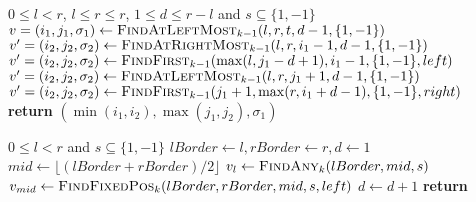 \begin{appendix}
    \begin{algorithm}[h!]
        \caption{$(l,r,d,t,s)$}\label{alg:falm_k}
        \begin{algorithmic}
            \Require $0 \leq l < r$, $l \leq r \leq r$, $1\leq d \leq r-l$ and $s \subseteq \{1,-1\}$
            \State $v = (i_1,j_1,\sigma_1) \gets \textsc{FindAtLeftMost$_{k-1}$}(l,r,t,d-1,\{1,-1\})$
             {
                \State $v' = (i_2,j_2,\sigma_2) \gets \textsc{FindAtRightMost$_{k-1}$}(l,r,i_1-1,d-1,\{1,-1\})$
                \State $v' = (i_2,j_2,\sigma_2) \gets \textsc{FindFirst$_{k-1}$}(\max(l, j_1-d+1),i_1-1,\{1,-1\}, left)$
                \EndIf
                \EndIf
                \State $v' = (i_2,j_2,\sigma_2) \gets \textsc{FindAtLeftMost$_{k-1}$}(l,r,j_1+1,d-1,\{1,-1\})$
                \EndIf
                \State $v' = (i_2,j_2,\sigma_2) \gets \textsc{FindFirst$_{k-1}$}(j_1+1,\max(r, i_1+d-1),\{1,-1\}, right)$
                \EndIf
                \EndIf
            }
                \EndIf
                \State \textbf{return} $(\min(i_1, i_2), \max(j_1, j_2), \sigma_1)$
            \EndIf

        \end{algorithmic}
    \end{algorithm}

    \begin{algorithm}[h!]
        \caption{$(l, r, s, left)$}
        \label{alg:FF}
        \begin{algorithmic}
            \Require $0\leq l < r$ and $s \subseteq \{1,-1\}$
            \State $lBorder \gets l, rBorder \gets r, d \gets 1$
            \State $ mid \gets \lfloor (lBorder + rBorder)/2 \rfloor $
            \State $v_l \gets \textsc{FindAny$_{k}$}(lBorder, mid, s)$
            \Else
            \State $v_{mid} \gets \textsc{FindFixedPos$_{k}$}(lBorder, rBorder, mid, s, left)$
            \EndIf
            \EndIf
            \State $d \gets d+1$
            \EndWhile
            \State \textbf{return} \Null
        \end{algorithmic}
    \end{algorithm}



\end{appendix}

